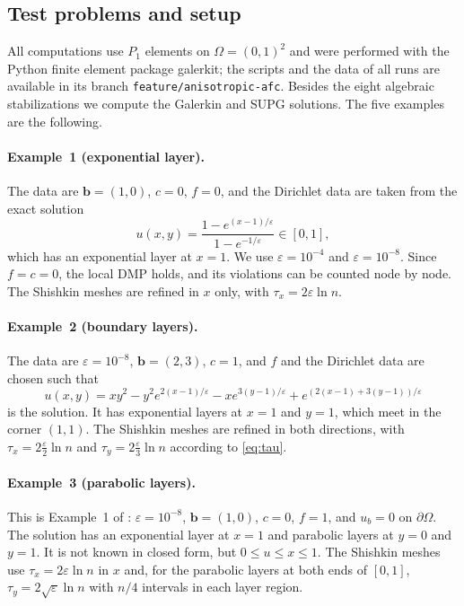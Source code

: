 \documentclass[11pt,a4paper]{article}
\newcommand{\eps}{\varepsilon}
\newcommand{\bb}{\boldsymbol{b}}
\theoremstyle{remark}
\begin{document}
\subsection{Test problems and setup}

All computations use $P_1$ elements on $\Omega=(0,1)^2$ and were performed with the Python finite element package
galerkit; the scripts and the data of all runs are available in its branch \texttt{feature/anisotropic-afc}.
Besides the eight algebraic stabilizations we compute the Galerkin and SUPG solutions. The five examples are the
following.

\paragraph{Example~1 (exponential layer).} The data are $\bb=(1,0)$, $c=0$, $f=0$, and the Dirichlet data are taken
from the exact solution
\begin{equation*}
  u(x,y)=\frac{1-e^{(x-1)/\eps}}{1-e^{-1/\eps}}\in[0,1],
\end{equation*}
which has an exponential layer at $x=1$. We use $\eps=10^{-4}$ and $\eps=10^{-8}$. Since $f=c=0$, the local DMP
holds, and its violations can be counted node by node. The Shishkin meshes are refined in $x$ only, with
$\tau_x=2\eps\ln n$.

\paragraph{Example~2 (boundary layers).} The data are $\eps=10^{-8}$, $\bb=(2,3)$, $c=1$, and $f$ and the Dirichlet data
are chosen such that
\begin{equation*}
  u(x,y)=xy^2-y^2e^{2(x-1)/\eps}-xe^{3(y-1)/\eps}+e^{(2(x-1)+3(y-1))/\eps}
\end{equation*}
is the solution. It has exponential layers at $x=1$ and $y=1$, which meet in the corner $(1,1)$. The Shishkin meshes
are refined in both directions, with $\tau_x=2\frac{\eps}{2}\ln n$ and $\tau_y=2\frac{\eps}{3}\ln n$ according to
\eqref{eq:tau}.

\paragraph{Example~3 (parabolic layers).} This is Example~1 of \cite{JK07}: $\eps=10^{-8}$, $\bb=(1,0)$, $c=0$, $f=1$,
and $u_b=0$ on $\partial\Omega$. The solution has an exponential layer at $x=1$ and parabolic layers at $y=0$ and $y=1$.
It is not known in closed form, but $0\le u\le x\le1$. The Shishkin meshes use $\tau_x=2\eps\ln n$ in $x$ and, for the
parabolic layers at both ends of $[0,1]$, $\tau_y=2\sqrt\eps\ln n$ with $n/4$ intervals in each layer region.
\end{document}

